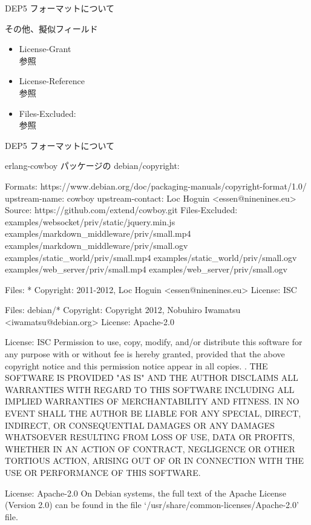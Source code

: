\begin{frame}[containsverbatim]{DEP5 フォーマットについて}

その他、擬似フィールド

\begin{itemize}
\item License-Grant \\
	 参照
\item License-Reference \\
	 参照
\item Files-Excluded: \\
	 参照
\end{itemize}
\end{frame}


\begin{frame}[containsverbatim]{DEP5 フォーマットについて}

erlang-cowboy パッケージの debian/copyright:
\begin{commandlinesmall}
Formats: https://www.debian.org/doc/packaging-manuals/copyright-format/1.0/
upstream-name: cowboy
upstream-contact: Loc Hoguin <essen@ninenines.eu>
Source: https://github.com/extend/cowboy.git
Files-Excluded: examples/websocket/priv/static/jquery.min.js
 examples/markdown_middleware/priv/small.mp4
 examples/markdown_middleware/priv/small.ogv
 examples/static_world/priv/small.mp4
 examples/static_world/priv/small.ogv
 examples/web_server/priv/small.mp4
 examples/web_server/priv/small.ogv

Files: *
Copyright: 2011-2012, Loc Hoguin <essen@ninenines.eu>
License: ISC

Files: debian/*
Copyright: Copyright 2012, Nobuhiro Iwamatsu <iwamatsu@debian.org>
License: Apache-2.0

License: ISC
 Permission to use, copy, modify, and/or distribute this software for any
 purpose with or without fee is hereby granted, provided that the above
 copyright notice and this permission notice appear in all copies.
 .
 THE SOFTWARE IS PROVIDED "AS IS" AND THE AUTHOR DISCLAIMS ALL WARRANTIES
 WITH REGARD TO THIS SOFTWARE INCLUDING ALL IMPLIED WARRANTIES OF
 MERCHANTABILITY AND FITNESS. IN NO EVENT SHALL THE AUTHOR BE LIABLE FOR
 ANY SPECIAL, DIRECT, INDIRECT, OR CONSEQUENTIAL DAMAGES OR ANY DAMAGES
 WHATSOEVER RESULTING FROM LOSS OF USE, DATA OR PROFITS, WHETHER IN AN
 ACTION OF CONTRACT, NEGLIGENCE OR OTHER TORTIOUS ACTION, ARISING OUT OF
 OR IN CONNECTION WITH THE USE OR PERFORMANCE OF THIS SOFTWARE.

License: Apache-2.0
 On Debian systems, the full text of the Apache License (Version 2.0)
 can be found in the file  `/usr/share/common-licenses/Apache-2.0' file.

\end{commandlinesmall}
\end{frame}

